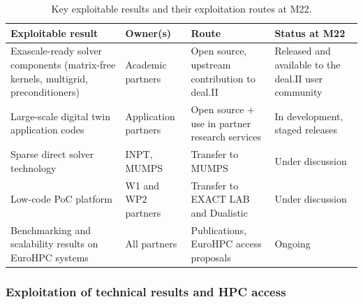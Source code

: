 \documentclass[a4paper,12pt, numbers]{article}
\begin{document}
\begin{table}[htbp]
\centering
\caption{Key exploitable results and their exploitation routes at M22.}\label{tab:exploitation}
\medskip
\renewcommand{\arraystretch}{1.2}
\footnotesize
\begin{tabular}{p{4cm}p{2.2cm}p{3.5cm}p{3.8cm}}
\toprule
\textbf{Exploitable result} & \textbf{Owner(s)} & \textbf{Route} & \textbf{Status at M22} \\
\midrule
Exascale-ready solver components (matrix-free kernels, multigrid, preconditioners) & Academic partners & Open source, upstream contribution to deal.II & Released and available to the deal.II user community \\
\midrule
Large-scale digital twin application codes & Application partners & Open source + use in partner research services & In development, staged releases \\
\midrule
Sparse direct solver technology & INPT, MUMPS & Transfer to MUMPS & Under discussion \\
\midrule
Low-code PoC platform & W1 and WP2 partners & Transfer to EXACT LAB and Dualistic & Under discussion \\
\midrule
Benchmarking and scalability results on EuroHPC systems & All partners & Publications, EuroHPC access proposals & Ongoing \\
\bottomrule
\end{tabular}
\end{table}

\subsubsection*{Exploitation of technical results and HPC access}
\end{document}
